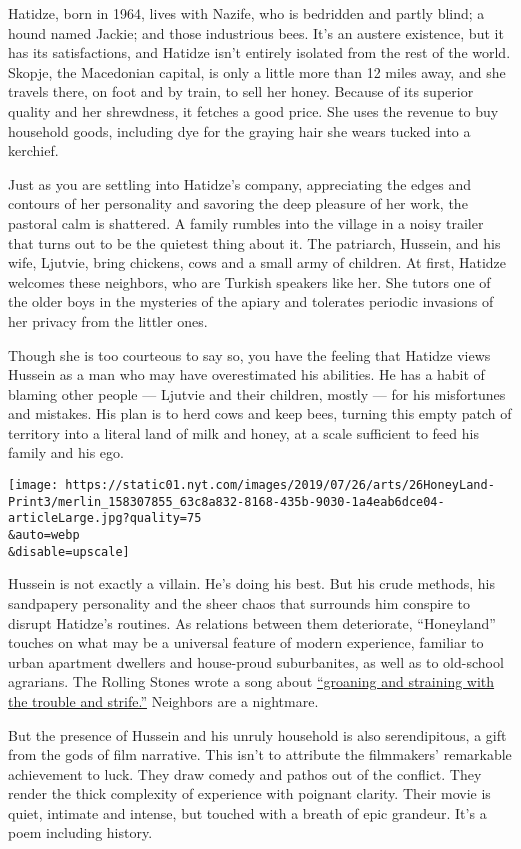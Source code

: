 Hatidze, born in 1964, lives with Nazife, who is bedridden and partly
blind; a hound named Jackie; and those industrious bees. It's an austere
existence, but it has its satisfactions, and Hatidze isn't entirely
isolated from the rest of the world. Skopje, the Macedonian capital, is
only a little more than 12 miles away, and she travels there, on foot
and by train, to sell her honey. Because of its superior quality and her
shrewdness, it fetches a good price. She uses the revenue to buy
household goods, including dye for the graying hair she wears tucked
into a kerchief.

Just as you are settling into Hatidze's company, appreciating the edges
and contours of her personality and savoring the deep pleasure of her
work, the pastoral calm is shattered. A family rumbles into the village
in a noisy trailer that turns out to be the quietest thing about it. The
patriarch, Hussein, and his wife, Ljutvie, bring chickens, cows and a
small army of children. At first, Hatidze welcomes these neighbors, who
are Turkish speakers like her. She tutors one of the older boys in the
mysteries of the apiary and tolerates periodic invasions of her privacy
from the littler ones.

Though she is too courteous to say so, you have the feeling that Hatidze
views Hussein as a man who may have overestimated his abilities. He has
a habit of blaming other people --- Ljutvie and their children, mostly
--- for his misfortunes and mistakes. His plan is to herd cows and keep
bees, turning this empty patch of territory into a literal land of milk
and honey, at a scale sufficient to feed his family and his ego.

\texttt{[image: https://static01.nyt.com/images/2019/07/26/arts/26HoneyLand-Print3/merlin\_158307855\_63c8a832-8168-435b-9030-1a4eab6dce04-articleLarge.jpg?quality=75\\\&auto=webp\\\&disable=upscale]}

Hussein is not exactly a villain. He's doing his best. But his crude
methods, his sandpapery personality and the sheer chaos that surrounds
him conspire to disrupt Hatidze's routines. As relations between them
deteriorate, ``Honeyland'' touches on what may be a universal feature of
modern experience, familiar to urban apartment dwellers and house-proud
suburbanites, as well as to old-school agrarians. The Rolling Stones
wrote a song about
\href{https://www.youtube.com/watch?v=omGDmvNWLVw}{``groaning and
straining with the trouble and strife.''} Neighbors are a nightmare.

But the presence of Hussein and his unruly household is also
serendipitous, a gift from the gods of film narrative. This isn't to
attribute the filmmakers' remarkable achievement to luck. They draw
comedy and pathos out of the conflict. They render the thick complexity
of experience with poignant clarity. Their movie is quiet, intimate and
intense, but touched with a breath of epic grandeur. It's a poem
including history.

